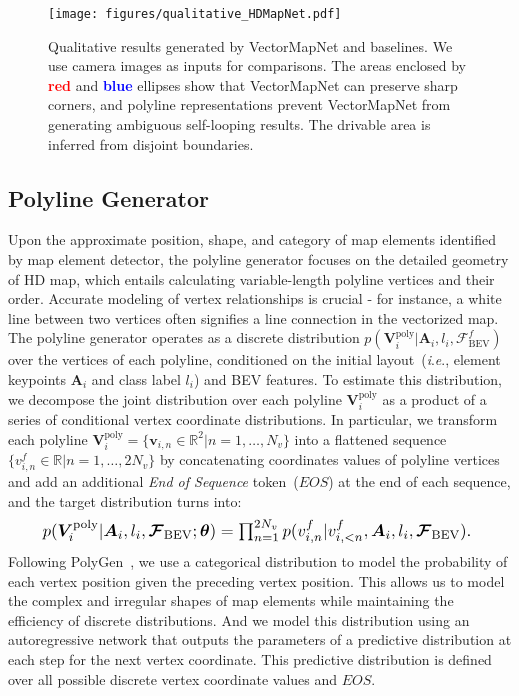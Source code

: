 \documentclass{article}
\newcommand{\ie}{\textit{i}.\textit{e}., }
\theoremstyle{plain}
\theoremstyle{definition}
\theoremstyle{remark}
\begin{document}
\begin{figure*}[htp]
    \centering
    \texttt{[image: figures/qualitative\_HDMapNet.pdf]}
    \vspace{-1em}
    \caption{
    Qualitative results generated by VectorMapNet and baselines. We use camera images as inputs for comparisons. The areas enclosed by \textbf{\textcolor{red}{red}} and \textbf{\textcolor{blue}{blue}} ellipses show that VectorMapNet can preserve sharp corners, and polyline representations prevent VectorMapNet from generating ambiguous self-looping results. The drivable area is inferred from disjoint boundaries. }
    \label{fig:qualitative_HDMapNet} 
    \vspace{-1.em}

\end{figure*}

\subsection{Polyline Generator}
\label{sec:gen}
Upon the approximate position, shape, and category of map elements identified by map element detector, the polyline generator focuses on the detailed geometry of HD map, which entails calculating variable-length polyline vertices and their order. Accurate modeling of vertex relationships is crucial - for instance, a white line between two vertices often signifies a line connection in the vectorized map.
The polyline generator operates as a discrete distribution $p(\bm{V}_{i}^{\mathrm{poly}}| \bm{A}_{i}, l_{i}, \bm{\mathcal{F}}_{\mathrm{BEV}}^f)$ over the vertices of each polyline, conditioned on the initial layout~(\ie element keypoints $\bm{A}_{i}$ and class label $l_{i}$) and BEV features. To estimate this distribution, we decompose the joint distribution over each polyline  $\bm{V}_{i}^{\mathrm{poly}}$ as a product of a series of conditional vertex coordinate distributions. 
In particular, we transform each polyline $\bm{V}_i^{\mathrm{poly}}=\{\bm{v}_{i,n}\in\mathbb{R}^2 | n = 1,\dots,N_v\}$ into a flattened sequence $\{v_{i,n}^{f}\in\mathbb{R}|n = 1,\dots,2N_v\}$ by concatenating coordinates values of polyline vertices and add an additional \textit{End of Sequence} token~($EOS$) at the end of each sequence, and the target distribution turns into:
\begin{equation}
    \resizebox{0.9\hsize}{!}{$p(\bm{V}_{i}^{\mathrm{poly}}| \bm{A}_{i}, l_{i}, \bm{\mathcal{F}}_{\mathrm{BEV}}; \bm{\theta}) = \prod_{n=1}^{2N_v} p(v_{i,n}^{f}| v_{i,<n}^{f}, \bm{A}_{i}, l_{i}, \bm{\mathcal{F}}_{\mathrm{BEV}}).$
    }
\end{equation}
Following PolyGen~\cite{nash2020polygen}, we use a categorical distribution to model the probability of each vertex position given the preceding vertex position. This allows us to model the complex and irregular shapes of map elements while maintaining the efficiency of discrete distributions. And we model this distribution using an autoregressive network that outputs the parameters of a predictive distribution at each step for the next vertex coordinate. This predictive distribution is defined over all possible discrete vertex coordinate values and $EOS$. 
\end{document}
